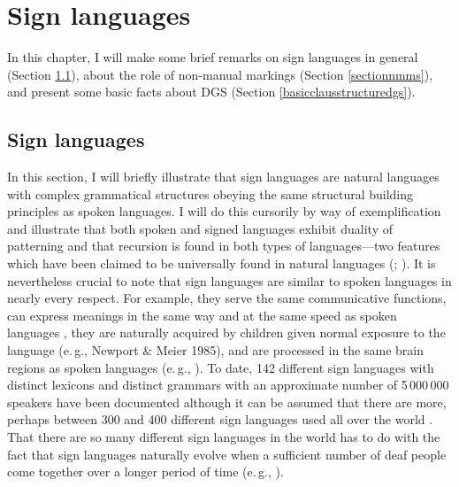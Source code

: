 \chapter{Sign languages}\label{chapterone}
In this chapter, I will make some brief remarks on sign languages in general (Section \ref{signlanguagesintro}), about the role of non-manual markings (Section \ref{sectionnmms}), and present some basic facts about DGS (Section \ref{basicclausstructuredgs}). 
%


\section{Sign languages}\label{signlanguagesintro}
In this section, I will briefly illustrate that sign languages are natural languages with complex grammatical structures obeying the same structural building principles as spoken languages. I will do this cursorily by way of exemplification and illustrate that both spoken and signed languages exhibit duality of patterning and that recursion is found in both types of languages---two features which have been  claimed to be universally found in natural languages (\citealt{martinet1949double}; \citealt{hockett1960origin}). It is nevertheless crucial to note that sign languages are similar to spoken languages in nearly every respect. For example, they serve the same communicative functions, can express meanings in the same way and at the same speed as spoken languages \citep{bellugi1972comparison}, they are naturally acquired by children given normal exposure to the language (e.\,g., Newport \& Meier 1985), and are processed in the same brain regions as spoken languages (e.\,g., \citealt{emmorey2002language}). To date, 142 different sign languages with distinct lexicons and distinct grammars with an approximate number of 5\,000\,000 speakers have been documented \citep{simons2018ethnologue} although it can be assumed that there are more, perhaps between 300 and 400 different sign languages used all over the world \citep{zeshan2009sign}. That there are so many different sign languages in the world has to do with the fact that sign languages naturally evolve when a sufficient number of deaf people come together over a longer period of time (e.\,g., \citealt{kegletal1999creation}).


